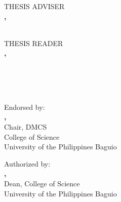 \documentclass[a4paper, 12pt]{report}
\begin{document}
        \else
            \begin{minipage}[t]{.44\textwidth}\centering
                THESIS ADVISER\\
                \vspace{0.1 cm} 
                \textbf{\MakeUppercase{\adviserone}, \adviseronedegree}\\
                \small{
                \adviseroneposition\\
                \adviseroneuniv}
            \end{minipage}\hspace{.02\textwidth}
            \begin{minipage}[t]{.44\textwidth}\centering
                THESIS READER\\
                \vspace{0.1 cm} 
                \textbf{\MakeUppercase{\reader}, \readerdegree}\\
                \small{
                \readerposition\\
                \readeruniv}\\
                \vspace{0.75 cm} 
            \end{minipage}\\
        \fi
     \fi
\begin{minipage}[t]{.44\textwidth}\centering
    Endorsed by:\\
    \vspace{1 cm} 
    \textbf{\MakeUppercase{\chair}, \chairdegree}\\
    \small{
    Chair, DMCS\\
    College of Science\\
    University of the Philippines Baguio}\\
\end{minipage}\hspace{.02\textwidth}
\begin{minipage}[t]{.44\textwidth}\centering
    Authorized by:\\
    \vspace{1 cm} 
    \textbf{\MakeUppercase{\dean}, \deandegree}\\
    \small{
    Dean, College of Science\\
    University of the Philippines Baguio}\\
\end{minipage}
\vspace*{\fill}
\end{document}

